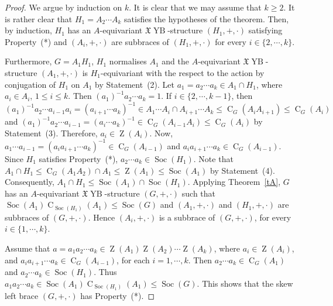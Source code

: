 \documentclass[12pt,a4paper]{article}
\newcommand\XX{\mathfrak{X}}
\DeclareMathOperator{\C}{C}
\DeclareMathOperator{\Soc}{Soc}
\DeclareMathOperator{\Z}{Z}
\DeclareMathOperator{\YB}{YB}
\theoremstyle{definition}
\begin{document}
\begin{proof}
We argue by induction on $k$. It is clear that we may assume that  $k\geq 2$. It is rather clear that $H_1 = A_2\cdots A_{k}$ satisfies the hypotheses of the theorem. Then, by induction, $H_1$ has an $A$-equivariant $\XX\YB$-structure $(H_1,+,\cdot)$ satisfying Property~(*) and $(A_i,+,\cdot)$ are subbraces of $(H_1,+,\cdot)$ for every $i \in \{2, \cdots,k\}$.

Furthermore, $G = A_1H_1$, $H_1$ normalises $A_1$ and the $A$-equivariant $\XX\YB$-structure
$(A_1,+,\cdot )$ is $H_1$-equivariant with the respect to the action by conjugation of $H_1$ on
$A_1$ by Statement~(2). Let  $a_1=a_2\cdots a_{k} \in A_1\cap H_1$, where
$a_i \in A_i$,  $1\leq i \leq k$. Then $(a_1)^{-1}a_2\cdots a_k=1$. If $i \in \{2, \cdots, k-1\}$, then $(a_1)^{-1}a_2\cdots a_{i-1} a_i=(a_{i+1}\cdots a_{k})^{-1} \in A_1\cdots A_i\cap A_{i+1}\cdots A_{k}\leq \C_G(A_iA_{i+1})\leq \C_G(A_{i})$ and $(a_1)^{-1}a_2\cdots a_{i-1} = (a_{i}\cdots a_{k})^{-1}\in \C_G(A_{i-1}A_{i})\leq \C_G(A_{i})$ by Statement~(3). Therefore, $a_{i}\in \Z(A_{i})$. Now, $a_1\cdots a_{i-1}=(a_ia_{i+1}\cdots a_{k})^{-1}\in \C_G(A_{i-1})$ and $a_ia_{i+1}\cdots a_{k}\in \C_{G}(A_{i-1})$. Since $H_1$ satisfies Property~(*), $a_2\cdots a_k\in \Soc (H_1)$. Note that  $A_1\cap H_1\leq \C_G(A_1A_2)\cap A_1\leq \Z(A_1)\leq \Soc (A_1)$ by Statement~(4). Consequently, $A_1 \cap H_1 \leq \Soc (A_1) \cap \Soc (H_1)$. Applying Theorem~\ref{tA}, $G$ has an $A$-equivariant $\XX\YB$-structure $(G, +, \cdot)$ such that $\Soc(A_1)\C_{\Soc (H_1)}(A_1)\leq \Soc (G)$ and $(A_1, +, \cdot)$ and $(H_1,+,\cdot)$ are subbraces of $(G,+,\cdot)$. Hence $(A_i,+,\cdot)$ is a subbrace of $(G,+,\cdot)$, for every $i \in \{1, \cdots,k\}$.

Assume that $a=a_1a_2\cdots a_k\in \Z(A_1)\Z(A_2)\cdots \Z(A_k)$, where $a_i\in \Z(A_i)$, and $a_ia_{i+1}\cdots a_k\in \C_G(A_{i-1})$, for each $i=1, \cdots,k$. Then $a_2\cdots a_k\in \C_G(A_1)$ and $a_2\cdots a_k\in \Soc (H_1)$. Thus $a_1a_2\cdots a_k\in \Soc(A_1)\C_{\Soc (H_1)}(A_1)\leq \Soc (G)$. This shows that the skew left brace $(G, +, \cdot)$ has Property~(*).
\end{proof}
\end{document}
